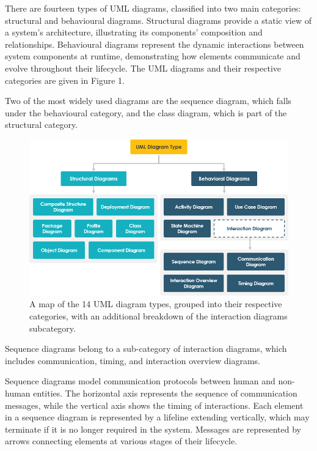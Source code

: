 \documentclass{article}
\newcounter{subsubsubsection}[subsubsection]
\begin{document}
{There are fourteen types of UML diagrams, classified into two main categories: structural and behavioural diagrams\cite{Seidl_Scholz_Huemer_Kappel_Duffy_2014}. Structural diagrams provide a static view of a system's architecture, illustrating its components' composition and relationships. Behavioural diagrams represent the dynamic interactions between system components at runtime, demonstrating how elements communicate and evolve throughout their lifecycle. The UML diagrams and their respective categories are given in Figure 1. 

Two of the most widely used diagrams are the sequence diagram, which falls under the behavioural category, and the class diagram, which is part of the structural category.

\begin{figure}[H]
    \centering
    \includegraphics[width=1.0\linewidth]{01-uml-diagram-types.png}
    \caption{A map of the 14 UML diagram types, grouped into their respective categories, with an additional breakdown of the interaction diagrams subcategory\cite{visualpara}.}
    \label{fig:UML Diagram Map}
\end{figure}


Sequence diagrams belong to a sub-category of interaction diagrams, which includes communication, timing, and interaction overview diagrams\cite{Seidl_Scholz_Huemer_Kappel_Duffy_2014}.

Sequence diagrams model communication protocols between human and non-human entities. The horizontal axis represents the sequence of communication messages, while the vertical axis shows the timing of interactions. Each element in a sequence diagram is represented by a lifeline extending vertically, which may terminate if it is no longer required in the system. Messages are represented by arrows connecting elements at various stages of their lifecycle. 

}
\end{document}
